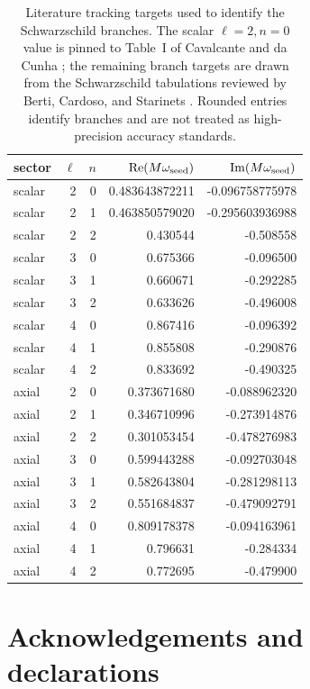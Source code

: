 \documentclass[12pt,a4paper]{article}
\begin{document}
\begin{table}[H]
\centering
\scriptsize
\setlength{\tabcolsep}{4pt}
\begin{tabular}{lrrrr}
\toprule
sector & \(\ell\) & \(n\) & \(\operatorname{Re}(M\omega_{\rm seed})\) & \(\operatorname{Im}(M\omega_{\rm seed})\)\\
\midrule
scalar & 2 & 0 & 0.483643872211 & -0.096758775978\\
scalar & 2 & 1 & 0.463850579020 & -0.295603936988\\
scalar & 2 & 2 & 0.430544 & -0.508558\\
scalar & 3 & 0 & 0.675366 & -0.096500\\
scalar & 3 & 1 & 0.660671 & -0.292285\\
scalar & 3 & 2 & 0.633626 & -0.496008\\
scalar & 4 & 0 & 0.867416 & -0.096392\\
scalar & 4 & 1 & 0.855808 & -0.290876\\
scalar & 4 & 2 & 0.833692 & -0.490325\\
axial & 2 & 0 & 0.373671680 & -0.088962320\\
axial & 2 & 1 & 0.346710996 & -0.273914876\\
axial & 2 & 2 & 0.301053454 & -0.478276983\\
axial & 3 & 0 & 0.599443288 & -0.092703048\\
axial & 3 & 1 & 0.582643804 & -0.281298113\\
axial & 3 & 2 & 0.551684837 & -0.479092791\\
axial & 4 & 0 & 0.809178378 & -0.094163961\\
axial & 4 & 1 & 0.796631 & -0.284334\\
axial & 4 & 2 & 0.772695 & -0.479900\\
\bottomrule
\end{tabular}
\caption{Literature tracking targets used to identify the Schwarzschild
branches. The scalar \(\ell=2,n=0\) value is pinned to Table~I of Cavalcante
and da Cunha \cite{Cavalcante2021}; the remaining branch targets are drawn from
the Schwarzschild tabulations reviewed by Berti, Cardoso, and Starinets
\cite{Berti2009}. Rounded entries identify branches and are not treated as
high-precision accuracy standards.}
\label{tab:schwarzschildseeds}
\end{table}

\section*{Acknowledgements and declarations}
\end{document}
